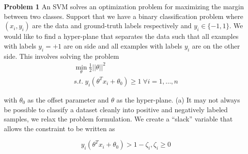 \documentclass[12pt]{article}
\begin{document}
\maketitle


\textbf{Problem 1}  \newline 
An SVM solves an optimization problem for maximizing the margin between two classes. Support
that we have a binary classification problem where $(x_{i} , y_{i})$ are the data and ground-truth labels
respectively and $y_{i} \in  \{-1,1\}$. We would like to find a hyper-plane that separates the data such that
all examples with labels $y_{i} = +1$ are on side and all examples with labels $y_{i}$ are on the other
side. This involves solving the problem 
\begin{equation} 
\begin{split} 
\min_{\theta} \frac{1}{2}  ||\theta||^{2}     \\ 
 s.t. \;  y_{i}(\theta^{T}x_{i} + \theta_{0}  ) \geq 1 \;  \forall i = 1,\dots,n  
\end{split}  
\end{equation} 

with $\theta_{0}$ as the offset parameter and $\theta$ as the hyper-plane.  \newline 
(a) It may not always be possible to classify a dataset cleanly into positive and negatively
labeled samples,  we relax the problem formulation. We create a 
“slack” variable that allows the constraint to be written
as

$$  y_i (\theta^T x_i + \theta_0 ) > 1 - \zeta_{i}, \zeta_{i} \geq 0  $$
\end{document}
